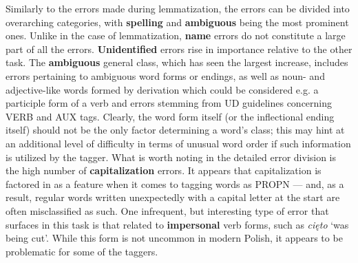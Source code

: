 Similarly to the errors made during lemmatization, the errors can be divided into overarching categories, with \textbf{spelling} and \textbf{ambiguous} being the most prominent ones. Unlike in the case of lemmatization, \textbf{name} errors do not constitute a large part of all the errors. \textbf{Unidentified} errors rise in importance relative to the other task. The \textbf{ambiguous} general class, which has seen the largest increase, includes errors pertaining to ambiguous word forms or endings, as well as noun- and adjective-like words formed by derivation which could be considered e.g. a participle form of a verb and errors stemming from UD guidelines concerning VERB and AUX tags. Clearly, the word form itself (or the inflectional ending itself) should not be the only factor determining a word's class; this may hint at an additional level of difficulty in terms of unusual word order if such information is utilized by the tagger. What is worth noting in the detailed error division is the high number of \textbf{capitalization} errors. It appears that capitalization is factored in as a feature when it comes to tagging words as PROPN --- and, as a result, regular words written unexpectedly with a capital letter at the start are often misclassified as such. One infrequent, but interesting type of error that surfaces in this task is that related to \textbf{impersonal} verb forms, such as \textit{cięto} `was being cut'. While this form is not uncommon in modern Polish, it appears to be problematic for some of the taggers. 

